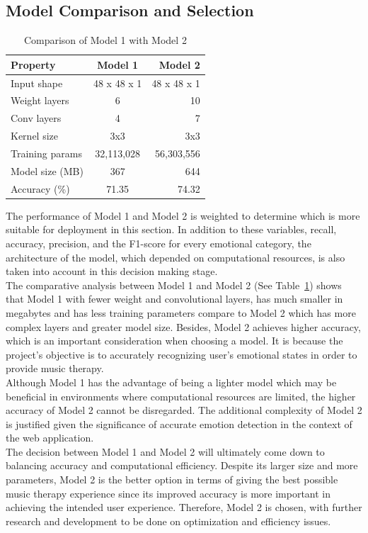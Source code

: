\subsection{Model Comparison and Selection}
\begin{table}[H]
    \centering
    \renewcommand{\arraystretch}{1.5}
    \begin{tabular*}{\textwidth}{@{\extracolsep{\fill}}lcr}
    \toprule
    \textbf{Property} & \textbf{Model 1} & \textbf{Model 2} \\
    \midrule
    Input shape & 48 x 48 x 1 & 48 x 48 x 1 \\
    Weight layers & 6 & 10 \\
    Conv layers & 4 & 7 \\
    Kernel size & 3x3 & 3x3 \\
    Training params & 32,113,028 & 56,303,556 \\
    Model size (MB) & 367 & 644 \\
    Accuracy (\%) & 71.35 & 74.32 \\
    \bottomrule
    \end{tabular*}
    \caption{Comparison of Model 1 with Model 2}
    \label{tab:comparison-models}
\end{table}
The performance of Model 1 and Model 2 is weighted to determine which is more suitable for deployment in this section.
In addition to these variables, recall, accuracy, precision, and the F1-score for every emotional category, the architecture of the model, which depended on computational resources, is also taken into account in this decision making stage. 
\\
\indent The comparative analysis between Model 1 and Model 2 (See Table~\ref{tab:comparison-models}) shows that Model 1 with fewer weight and convolutional layers, has much smaller in megabytes and has less training parameters compare to Model 2 which has more complex layers and greater model size.
Besides, Model 2 achieves higher accuracy, which is an important consideration when choosing a model.
It is because the project's objective is to accurately recognizing user's emotional states in order to provide music therapy. 
\\
\indent Although Model 1 has the advantage of being a lighter model which may be beneficial in environments where computational resources are limited, the higher accuracy of Model 2 cannot be disregarded.
The additional complexity of Model 2 is justified given the significance of accurate emotion detection in the context of the web application.
\\
\indent The decision between Model 1 and Model 2 will ultimately come down to balancing accuracy and computational efficiency.
Despite its larger size and more parameters, Model 2 is the better option in terms of giving the best possible music therapy experience since its improved accuracy is more important in achieving the intended user experience.
Therefore, Model 2 is chosen, with further research and development to be done on optimization and efficiency issues.
\\

